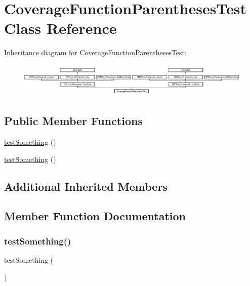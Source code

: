 \hypertarget{class_coverage_function_parentheses_test}{}\section{Coverage\+Function\+Parentheses\+Test Class Reference}
\label{class_coverage_function_parentheses_test}
Inheritance diagram for Coverage\+Function\+Parentheses\+Test\+:\begin{figure}[H]
\begin{center}
\leavevmode
\includegraphics[height=1.651917cm]{class_coverage_function_parentheses_test}
\end{center}
\end{figure}
\subsection*{Public Member Functions}
\begin{DoxyCompactItemize}
\item 
\mbox{\hyperlink{class_coverage_function_parentheses_test_a0fc4e17369bc9607ebdd850d9eda8167}{test\+Something}} ()
\item 
\mbox{\hyperlink{class_coverage_function_parentheses_test_a0fc4e17369bc9607ebdd850d9eda8167}{test\+Something}} ()
\end{DoxyCompactItemize}
\subsection*{Additional Inherited Members}


\subsection{Member Function Documentation}
\mbox{\label{class_coverage_function_parentheses_test_a0fc4e17369bc9607ebdd850d9eda8167}} 
\subsubsection{\texorpdfstring{test\+Something()}{testSomething()}\hspace{0.1cm}{\footnotesize\ttfamily [1/2]}}
{\footnotesize\ttfamily test\+Something (\begin{DoxyParamCaption}{ }\end{DoxyParamCaption})}

